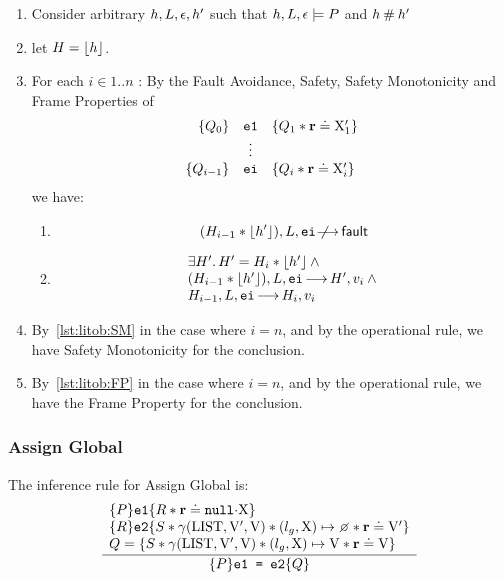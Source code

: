 \documentclass{article}
\begin{document}
\begin{enumerate}
        \item Consider arbitrary $h,L,\epsilon,h'$ such that $h,L,\epsilon \models P$ and $h\mathbin{\#} h'$
        \item let $H = \lfloor h\rfloor$.
        \item  For each $i \in 1..n$ :
                By the Fault Avoidance, Safety, Safety Monotonicity and Frame Properties of
                \[ \begin{array}{rcl}
                        \{Q_{0}\}&{\mbox{\texttt{{\upshape e1}}}}&\{Q_1 \mathbin{*} {\mathrm{\textbf{r}}} \doteq {\ensuremath{\mathrm{X}}}_1'\}\\
                        &\vdots&\\
                        \{Q_{i-1}\}&{\mbox{\texttt{{\upshape ei}}}}&\{Q_i \mathbin{*} {\mathrm{\textbf{r}}} \doteq {\ensuremath{\mathrm{X}}}_i'\}
                \end{array}\] 
                we have:
                \begin{enumerate}
                        \item \label{lst:litob:SM} \[ (H_{i-1} \mathbin{*} \lfloor h'\rfloor),L,\mbox{\texttt{{\upshape ei}}} \not\!\!\!\!{\,\longrightarrow\,}{\mathsf{fault}} \]
                        \item \label{lst:litob:FP} 
                                \[\begin{array}{l}
                                        \exists H' \mathpunct{.} H' = H_i \mathbin{*} \lfloor h'\rfloor \land {}\\
                                        (H_{i-1} \mathbin{*} \lfloor h'\rfloor),L,\mbox{\texttt{{\upshape ei}}} {\,\longrightarrow\,} H',v_i \land {} \\
                                        H_{i-1},L,\mbox{\texttt{{\upshape ei}}} {\,\longrightarrow\,} H_i,v_i
                                \end{array}\]
                \end{enumerate}
        \item By~\ref{lst:litob:SM} in the case where $i=n$, and by the operational rule, we have Safety Monotonicity for the conclusion.
        \item By~\ref{lst:litob:FP} in the case where $i=n$, and by the operational rule, we have the Frame Property for the conclusion.
\end{enumerate}

\subsubsection{Assign Global}

The inference rule for Assign Global is:
\[\frac
{\begin{array}{l}
        \tr P {\js{e1}} {R \sep\rv\doteq \nil\sv\V{X}}\\
\tr R {\js{e2}} {S\sep\getValue(\V{LIST},\LVAL',\LVAL) \sep (\lgo,\V{X}) \pointsto\none \sep\rv\doteq \LVAL'}\\
Q = \{S\sep\getValue(\V{LIST},\LVAL',\LVAL) \sep {} (\lgo,\V{X})\pointsto\LVAL \sep\rv\doteq \LVAL\}
\end{array}}
{ \tr P {\js{e1 = e2}} Q}
\]
\end{document}
